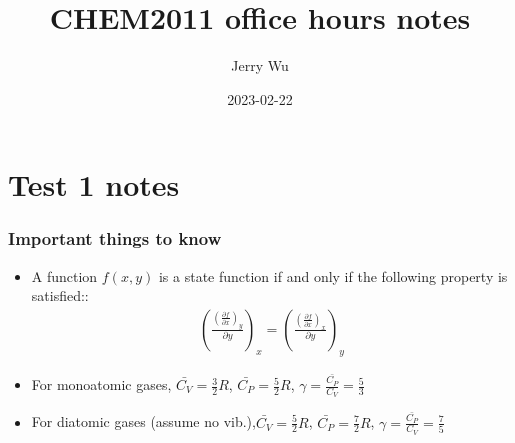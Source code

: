 \documentclass[12pt]{book}
\title{CHEM2011 office hours notes}
\author{Jerry Wu}
\date{2023-02-22}
\begin{document}
\maketitle
\chapter*{Test 1 notes}

\subsection*{Important things to know}

\begin{itemize}
    \item A function $f(x,y)$ is a state function if and only if the following property is satisfied::
    \begin{align*}
        \left(\frac{\left(\frac{\partial f}{\partial x}\right)_y}{\partial y}\right)_x=\left(\frac{\left(\frac{\partial f}{\partial x}\right)_x}{\partial y}\right)_y
    \end{align*}
    \item For monoatomic gases, $\bar{C_V}=\frac{3}{2}R$, $\bar{C_P}=\frac{5}{2}R$, $\gamma=\frac{\bar{C_P}}{C_V}=\frac{5}{3}$
    \item For diatomic gases (assume no vib.),$\bar{C_V}=\frac{5}{2}R$, $\bar{C_P}=\frac{7}{2}R$, $\gamma=\frac{\bar{C_P}}{C_V}=\frac{7}{5}$
\end{itemize}
\end{document}
